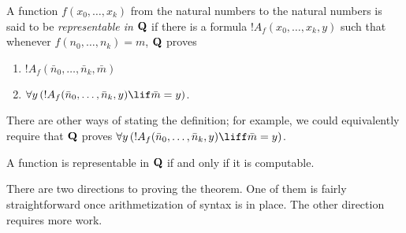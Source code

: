 \documentclass[../../../include/open-logic-section]{subfiles}
\begin{document}
\begin{defn}
  A function $f(x_0,\ldots,x_k)$ from the natural numbers to
  the natural numbers is said to be {\em representable in $\mathbf{Q}$} if
  there is a formula $!A_f(x_0,\dots,x_k,y)$ such that whenever
  $f(n_0,\dots,n_k) = m$, $\mathbf{Q}$ proves
\begin{enumerate}
\item $!A_f(\bar n_0, \dots, \bar n_k,\bar m)$
\item $\lforall[y][(!A_f(\bar n_0, \dots, \bar n_k,y) \lif \bar m = y)]$.
\end{enumerate}
\end{defn}

There are other ways of stating the definition; for example, we could
equivalently require that $\mathbf{Q}$ proves $\lforall[y][(!A_f(\bar n_0, \dots,
\bar n_k,y) \liff \bar m = y)]$.

\begin{thm}
A function is representable in $\mathbf{Q}$ if and only if it is computable.
\end{thm}

There are two directions to proving the theorem. One of them is fairly
straightforward once arithmetization of syntax is in place. The other
direction requires more work.
\end{document}
